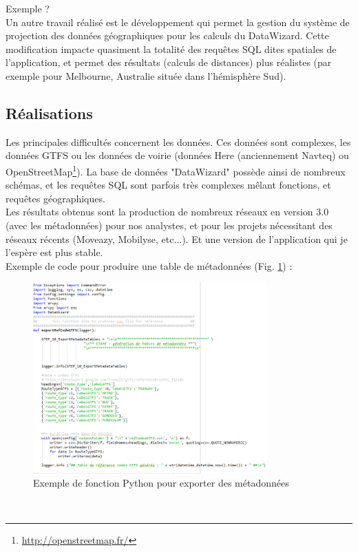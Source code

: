\begin{itemize}
Exemple ?\\

Un autre travail réalisé est le développement qui permet la gestion du système de projection des données géographiques pour les calculs du DataWizard. Cette modification impacte quasiment la totalité des requêtes SQL dites spatiales de l'application, et permet des résultats (calculs de distances) plus réalistes (par exemple pour Melbourne, Australie située dans l'hémisphère Sud).\\


\subsection{Réalisations}

Les principales difficultés concernent les données. Ces données sont complexes, les données GTFS ou les données de voirie (données Here (anciennement Navteq) ou OpenStreetMap\footnote{\url{http://openstreetmap.fr/}}). La base de données "DataWizard" possède ainsi de nombreux schémas, et les requêtes SQL sont parfois très complexes mêlant fonctions, et requêtes géographiques.\\

Les résultats obtenus sont la production de nombreux réseaux en version 3.0 (avec les métadonnées) pour nos analystes, et pour les projets nécessitant des réseaux récents (Moveazy, Mobilyse, etc...). Et une version de l'application qui je l'espère est plus stable.\\

Exemple de code pour produire une table de métadonnées (Fig. \ref{CodeMetadata}) :
\\
\begin{figure}[h]
	\centering
		\includegraphics[width=0.8\textwidth]{images/DW_exempleFonctionMetadata.PNG}
	\caption{Exemple de fonction Python pour exporter des métadonnées}
	\label{CodeMetadata}
\end{figure}\\


\end{itemize}
